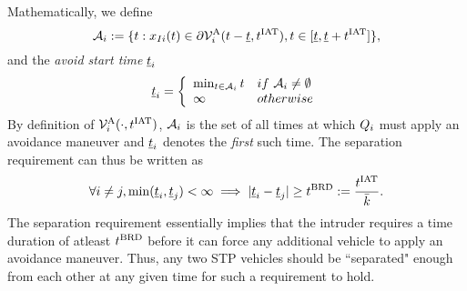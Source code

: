 Mathematically, we define
\begin{equation} \label{eqn:avoidStartTime}
\avoidt_{i} := \{t: \state_{\intr i}(t) \in \partial\brs^{\text{A}}_{i}(t-\tsa, \iat), t \in [\tsa, \tsa+\iat]\},
\end{equation}
and the \textit{avoid start time} $\underline{t}_i$
\begin{equation} \label{eqn:avoidStartTime2}
\tsa_i  = 
\left \{ 
\begin{array}{ll}
\min_{t \in  \avoidt_{i}} t & \mbox{if~} \avoidt_{i} \neq \emptyset\\
\infty & \mbox{otherwise}
\end{array}
\right.
\end{equation}  
By definition of $\mathcal{V}^{\text{A}}_{i}(\cdot, t^\text{IAT})$, $\mathcal{A}_{i}$ is the set of all times at which $Q_i$ must apply an avoidance maneuver and $\underline{t}_i$ denotes the \textit{first} such time. The separation requirement can thus be written as
\begin{equation} \label{eqn:sep_cond}
\forall i \neq j, \min(\tsa_i, \tsa_j)< \infty \implies |\tsa_i - \tsa_j| \geq \brd := \frac{\iat}{\nva}.
\end{equation}
The separation requirement essentially implies that the intruder requires a time duration of atleast $t^\text{BRD}$ before it can force any additional vehicle to apply an avoidance maneuver. Thus, any two STP vehicles should be ``separated" enough from each other at any given time for such a requirement to hold. 
%
%
